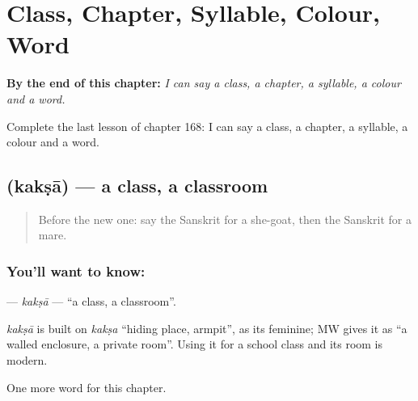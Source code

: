 
\chapter{Class, Chapter, Syllable, Colour, Word}
\label{ch:sa-class-chapter-syllable-colour-word}

\begin{chapteropening}
\textbf{By the end of this chapter:} \emph{I can say a class, a chapter, a syllable, a colour and a word.}

Complete the last lesson of chapter 168: I can say a class, a chapter, a syllable, a colour and a word.
\end{chapteropening}

\section[\texorpdfstring{\sk{कक्षा} (kakṣā)}{कक्षा (kakṣā)}]{ (kakṣā) — a class, a classroom}

\label{lesson:SA-C168-kaksa}



\begin{quote}
Before the new one: say the Sanskrit for a she-goat, then the Sanskrit for a mare.
\end{quote}

\subsection*{You'll want to know: }
\textbf{} — \emph{kakṣā} — \textquotedblleft{}a class, a classroom\textquotedblright{}.

\begin{cousinweb}
\emph{kakṣā} is built on \emph{kakṣa} \textquotedblleft{}hiding place, armpit\textquotedblright{}, as its feminine; MW gives it as \textquotedblleft{}a walled enclosure, a private room\textquotedblright{}. Using it for a school class and its room is modern.
\end{cousinweb}

\begin{grammarlens}[title={What you've built}]
One more word for this chapter.
\end{grammarlens}

